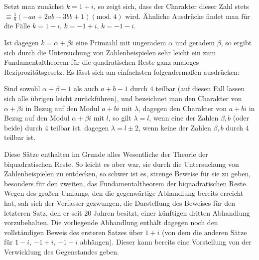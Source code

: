 Setzt man zunächst $k=1+i$, so zeigt sich, dass der Charakter dieser Zahl stets $\equiv\frac18(-aa+2ab-3bb+1)(\mathrm{mod.}\ 4)$ wird. Ähnliche Ausdrücke findet man für die Fälle $k=1-i$, $k=-1+i$, $k=-1-i$.

Ist dagegen $k=\alpha+\beta i$ eine Primzahl mit ungeradem $\alpha$ und geradem $\beta$, so ergibt sich durch die Untersuchung von Zahlenbeispielen sehr leicht ein zum Fundamentaltheorem für die quadratischen Reste ganz analoges Reziprozitätsgesetz. Es lässt sich am einfachsten folgendermaßen ausdrücken:

Sind sowohl $\alpha+\beta-1$ als auch $a+b-1$ durch $4$ teilbar (auf diesen Fall lassen sich alle übrigen leicht zurückführen), und bezeichnet man den Charakter von $\alpha+\beta i$ in Bezug auf den Modul $a+bi$ mit $\lambda$, dagegen den Charakter von $a+bi$ in Bezug auf den Modul $\alpha+\beta i$ mit $l$, so gilt $\lambda=l$, wenn eine der Zahlen $\beta,b$ (oder beide) durch $4$ teilbar ist. dagegen $\lambda=l\pm2$, wenn keine der Zahlen $\beta,b$ durch $4$ teilbar ist.

Diese Sätze enthalten im Grunde alles Wesentliche der Theorie der biquadratischen Reste. So leicht es aber war, sie durch die Untersuchung von Zahlenbeispielen zu entdecken, so schwer ist es, strenge Beweise für sie zu geben, besonders für den zweiten, das Fundamentaltheorem der biquadratischen Reste. Wegen des großen Umfangs, den die gegenwärtige Abhandlung bereits erreicht hat, sah sich der Verfasser gezwungen, die Darstellung des Beweises für den letzteren Satz, den er seit $20$ Jahren besitzt, einer künftigen dritten Abhandlung vorzubehalten. Die vorliegende Abhandlung enthält dagegen noch den vollständigen Beweis des ersteren Satzes über $1+i$ (von dem die
anderen Sätze für $1-i$, $-1+i$, $-1-i$ abhängen). Dieser kann bereits eine Vorstellung von der Verwicklung des Gegenstandes geben.

